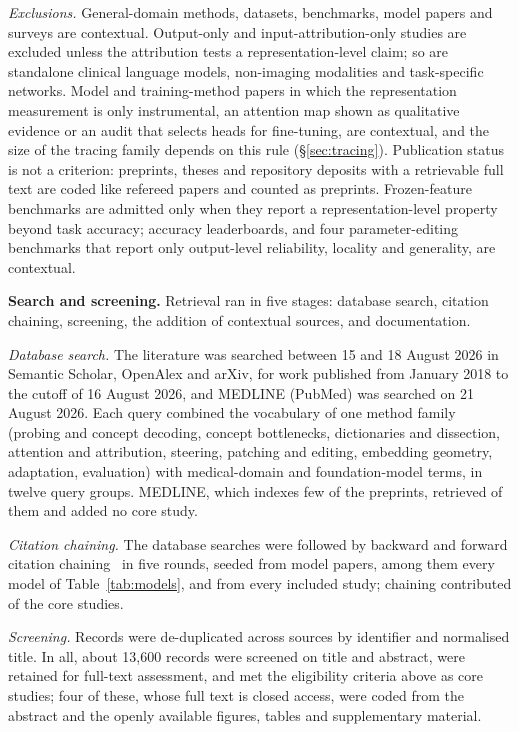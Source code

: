 \emph{Exclusions.} General-domain methods, datasets, benchmarks, model papers and surveys are
contextual. Output-only and input-attribution-only studies are excluded unless the attribution tests a
representation-level claim; so are standalone clinical language models, non-imaging modalities and
task-specific networks. Model and training-method papers in which the representation measurement is only
instrumental, an attention map shown as qualitative evidence or an audit that selects heads for
fine-tuning, are contextual, and the size of the tracing family depends on this rule
(\S\ref{sec:tracing}). Publication status is not a criterion: preprints, theses and repository deposits
with a retrievable full text are coded like refereed papers and counted as preprints. Frozen-feature
benchmarks are admitted only when they report a representation-level property beyond task accuracy;
accuracy leaderboards, and four parameter-editing benchmarks that report only output-level reliability,
locality and generality, are contextual.

\textbf{Search and screening.} Retrieval ran in five stages: database search, citation chaining,
screening, the addition of contextual sources, and documentation.

\emph{Database search.} The literature was searched between 15 and 18 August 2026 in Semantic Scholar,
OpenAlex and arXiv, for work published from January 2018 to the cutoff of 16 August 2026, and MEDLINE
(PubMed) was searched on 21 August 2026. Each query combined the vocabulary of one method family (probing
and concept decoding, concept bottlenecks, dictionaries and dissection, attention and attribution,
steering, patching and editing, embedding geometry, adaptation, evaluation) with medical-domain and
foundation-model terms, in twelve query groups. MEDLINE, which indexes few of the preprints, retrieved
\pmRecall{} of them and added no core study.

\emph{Citation chaining.} The database searches were followed by backward and forward citation
chaining~\cite{wohlin2014guidelines} in five rounds, seeded from \Nmodelseeds{} model papers, among them
every model of Table~\ref{tab:models}, and from every included study; chaining contributed
\Nstagechain{} of the \Ncore{} core studies.

\emph{Screening.} Records were de-duplicated across sources by identifier and normalised title. In all,
about 13,600 records were screened on title and abstract, \Nretained{} were retained for full-text
assessment, and \Ncore{} met the eligibility criteria above as core studies; four of these, whose full
text is closed access, were coded from the abstract and the openly available figures, tables and
supplementary material.

